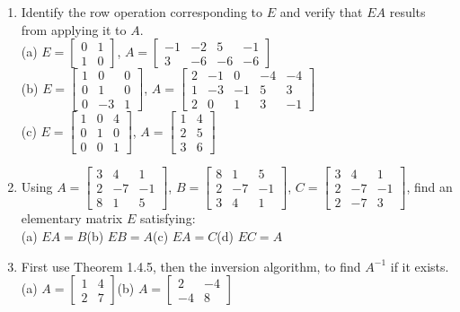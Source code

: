 \documentclass{article}
\theoremstyle{mystyle}
\begin{document}
\begin{enumerate}
    \item[5.] Identify the row operation corresponding to $E$ and verify that $EA$ results from applying it to $A$.\\
    (a) $E=\begin{bmatrix}0&1\\1&0\end{bmatrix}$, $A=\begin{bmatrix}-1&-2&5&-1\\3&-6&-6&-6\end{bmatrix}$\\
    (b) $E=\begin{bmatrix}1&0&0\\0&1&0\\0&-3&1\end{bmatrix}$, $A=\begin{bmatrix}2&-1&0&-4&-4\\1&-3&-1&5&3\\2&0&1&3&-1\end{bmatrix}$\\
    (c) $E=\begin{bmatrix}1&0&4\\0&1&0\\0&0&1\end{bmatrix}$, $A=\begin{bmatrix}1&4\\2&5\\3&6\end{bmatrix}$

    \item[7.] Using $A=\begin{bmatrix}3&4&1\\2&-7&-1\\8&1&5\end{bmatrix}$, $B=\begin{bmatrix}8&1&5\\2&-7&-1\\3&4&1\end{bmatrix}$, $C=\begin{bmatrix}3&4&1\\2&-7&-1\\2&-7&3\end{bmatrix}$, find an elementary matrix $E$ satisfying:\\
    (a) $EA=B$\quad (b) $EB=A$\quad (c) $EA=C$\quad (d) $EC=A$

    \item[9.] First use Theorem 1.4.5, then the inversion algorithm, to find $A^{-1}$ if it exists.\\
    (a) $A=\begin{bmatrix}1&4\\2&7\end{bmatrix}$\qquad (b) $A=\begin{bmatrix}2&-4\\-4&8\end{bmatrix}$


\end{enumerate}
\end{document}
